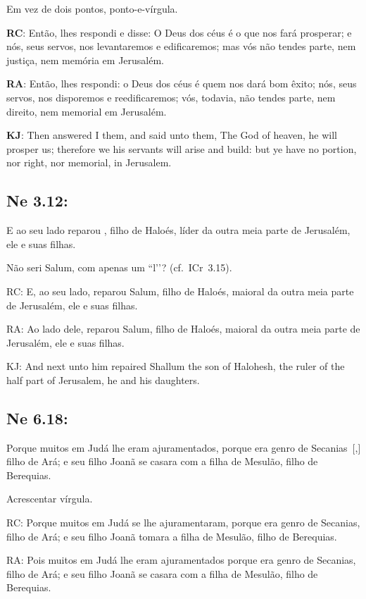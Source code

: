 Em vez de dois pontos, ponto-e-vírgula.

\textbf{RC}: Então, lhes respondi e disse: O Deus dos céus é o que nos fará prosperar; e nós, seus servos, nos levantaremos e edificaremos; mas vós não tendes parte, nem justiça, nem memória em Jerusalém.

\textbf{RA}: Então, lhes respondi: o Deus dos céus é quem nos dará bom êxito; nós, seus servos, nos disporemos e reedificaremos; vós, todavia, não tendes parte, nem direito, nem memorial em Jerusalém.

\textbf{KJ}: Then answered I them, and said unto them, The God of heaven, he will prosper us; therefore we his servants will arise and build: but ye have no portion, nor right, nor memorial, in Jerusalem.

\subsection{Ne 3.12:}

 E ao seu lado reparou , filho de Haloés, líder da outra meia parte de Jerusalém, ele e suas filhas.

Não seri Salum, com apenas um ``l’’? (cf.~ICr~3.15).

RC: E, ao seu lado, reparou Salum, filho de Haloés, maioral da outra meia parte de Jerusalém, ele e suas filhas.

RA: Ao lado dele, reparou Salum, filho de Haloés, maioral da outra meia parte de Jerusalém, ele e suas filhas.

KJ: And next unto him repaired Shallum the son of Halohesh, the ruler of the half part of Jerusalem, he and his daughters.

\subsection{Ne 6.18:}

 Porque muitos em Judá lhe eram ajuramentados, porque era genro de Secanias~[,] filho de Ará; e seu filho Joanã se casara com a filha de Mesulão, filho de Berequias.

Acrescentar vírgula.

RC: Porque muitos em Judá se lhe ajuramentaram, porque era genro de Secanias, filho de Ará; e seu filho Joanã tomara a filha de Mesulão, filho de Berequias.

RA: Pois muitos em Judá lhe eram ajuramentados porque era genro de Secanias, filho de Ará; e seu filho Joanã se casara com a filha de Mesulão, filho de Berequias.

